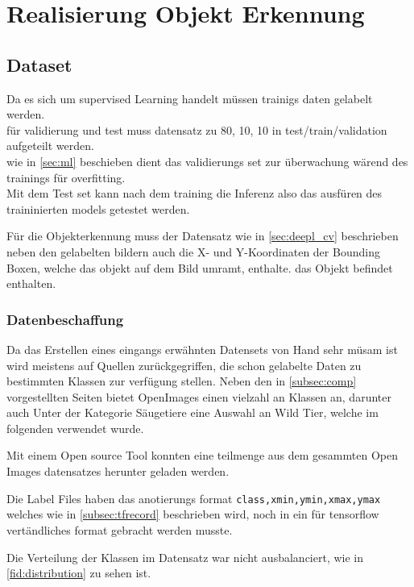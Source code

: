 \chapter{Realisierung Objekt Erkennung}\label{kap:objerk}

\section{Dataset}\label{sec:dataset}


Da es sich um supervised Learning handelt müssen trainigs daten gelabelt werden.\\
für validierung und test muss datensatz zu 80, 10, 10 in test/train/validation aufgeteilt werden.
\\
wie in \ref{sec:ml} beschieben dient das validierungs set zur überwachung wärend des trainings für overfitting.\\
Mit dem Test set kann nach dem training die Inferenz also das ausfüren des traininierten models getestet werden.

Für die Objekterkennung muss der Datensatz wie in \ref{sec:deepl_cv} beschrieben neben den gelabelten bildern auch
die X- und Y-Koordinaten der Bounding Boxen, welche das objekt auf dem Bild umramt, enthalte. das Objekt befindet enthalten.\\


\subsection{Datenbeschaffung}\label{subsec:get_data}

Da das Erstellen eines eingangs erwähnten Datensets von Hand sehr müsam ist wird meistens auf Quellen zurückgegriffen, die
schon gelabelte Daten zu bestimmten Klassen zur verfügung stellen. Neben den in \ref{subsec:comp} vorgestellten Seiten
bietet OpenImages einen vielzahl an Klassen an, darunter auch Unter der Kategorie Säugetiere eine Auswahl an Wild Tier, welche 
im folgenden verwendet wurde.

Mit einem Open source Tool \cite{OpenImages} konnten eine teilmenge aus dem gesammten Open Images datensatzes herunter geladen werden.

Die Label Files haben das anotierungs format \texttt{class,xmin,ymin,xmax,ymax} welches wie in \ref{subsec:tfrecord} 
beschrieben wird, noch in ein für tensorflow vertändliches format gebracht werden musste.

Die Verteilung der Klassen im Datensatz war nicht ausbalanciert, wie in \ref{fid:distribution} zu sehen ist.

